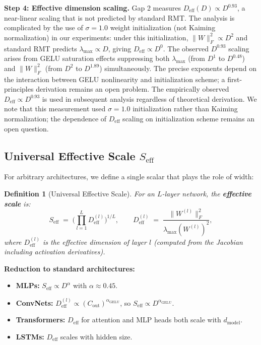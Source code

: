 \documentclass[11pt, a4paper]{article}
\newtheorem{dfn}[theo]{Definition}
\theoremstyle{plain}
\begin{document}
\medskip\noindent\textbf{Step 4: Effective dimension scaling.} Gap 2 measures $D_{\mathrm{eff}}(D) \propto D^{0.93}$, a near-linear scaling that is not predicted by standard RMT. The analysis is complicated by the use of $\sigma=1.0$ weight initialization (not Kaiming normalization) in our experiments: under this initialization, $\|W\|_F^2 \propto D^2$ and standard RMT predicts $\lambda_{\max} \propto D$, giving $D_{\mathrm{eff}} \propto D^0$. The observed $D^{0.93}$ scaling arises from GELU saturation effects suppressing both $\lambda_{\max}$ (from $D^1$ to $D^{0.48}$) and $\|W\|_F^2$ (from $D^2$ to $D^{1.89}$) simultaneously. The precise exponents depend on the interaction between GELU nonlinearity and initialization scheme; a first-principles derivation remains an open problem. The empirically observed $D_{\mathrm{eff}} \propto D^{0.93}$ is used in subsequent analysis regardless of theoretical derivation. We note that this measurement used $\sigma=1.0$ initialization rather than Kaiming normalization; the dependence of $D_{\mathrm{eff}}$ scaling on initialization scheme remains an open question.

\subsection{Universal Effective Scale $S_{\mathrm{eff}}$}

For arbitrary architectures, we define a single scalar that plays the role of width:

\begin{dfn}[Universal Effective Scale]\label{dfn:seff}
For an $L$-layer network, the \textbf{effective scale} is:
\begin{equation}
S_{\mathrm{eff}} \;=\; \Biggl(\prod_{l=1}^{L} D_{\mathrm{eff}}^{(l)}\Biggr)^{1/L},
\qquad
D_{\mathrm{eff}}^{(l)} \;=\; \frac{\|W^{(l)}\|_F^2}{\lambda_{\max}(W^{(l)})^2},
\end{equation}
where $D_{\mathrm{eff}}^{(l)}$ is the effective dimension of layer $l$ (computed from the Jacobian including activation derivatives).
\end{dfn}

\textbf{Reduction to standard architectures:}
\begin{itemize}
\item \textbf{MLPs:} $S_{\mathrm{eff}} \propto D^{\alpha}$ with $\alpha \approx 0.45$.
\item \textbf{ConvNets:} $D_{\mathrm{eff}}^{(l)} \propto (C_{\mathrm{out}})^{\alpha_{\mathrm{GELU}}}$, so $S_{\mathrm{eff}} \propto D^{\alpha_{\mathrm{GELU}}}$.
\item \textbf{Transformers:} $D_{\mathrm{eff}}$ for attention and MLP heads both scale with $d_{\mathrm{model}}$.
\item \textbf{LSTMs:} $D_{\mathrm{eff}}$ scales with hidden size.
\end{itemize}
\end{document}
